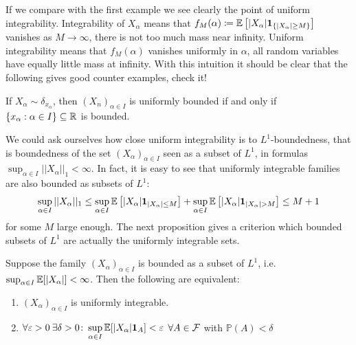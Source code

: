 If we compare with the first example we see clearly the point of uniform integrability. Integrability of $X_\alpha$ means that 
$f_M(\alpha) \coloneqq \mathbb{E}\left[\lvert X_{\alpha} \rvert \mathbf 1_{\{\lvert X_{\alpha} \rvert \geq M\}}\right]$ vanishes as $M\to \infty$, there is not too much mass near infinity. Uniform integrability means that $f_M(\alpha)$ vanishes uniformly in $\alpha$, all random variables have equally little mass at infinity. With this intuition it should be clear that the following gives good counter examples, check it!
\begin{luebung}
	If $X_\alpha \sim \delta_{x_\alpha}$, then $(X_n)_{\alpha \in I}$ is uniformly bounded if and only if $\{x_\alpha:\alpha\in I\}\subseteq \mathbb{R}$ is bounded. 

\end{luebung}
We could ask ourselves how close uniform integrability is to $L^1$-boundedness, that is boundedness of the set $(X_\alpha)_{\alpha \in I}$ seen as a subset of $L^1$, in formulas $\sup_{\alpha\in I}||X_\alpha||_{1}<\infty$.  In fact, it is easy to see that uniformly integrable families are also bounded as subsets of $L^1$:
			\begin{align}\label{uib}
				\sup\limits_{\alpha\in I} ||X_{\alpha}||_1 \leq \sup\limits_{\alpha\in I}\mathbb{E}\left[\lvert X_{\alpha}\rvert \mathbf 1_{\lvert X_{\alpha}\rvert \leq M}\right] + \sup\limits_{\alpha\in I}\mathbb{E}\left[\lvert X_{\alpha}\rvert \mathbf 1_{\lvert X_{\alpha}\rvert > M}\right] \leq M + 1
			\end{align}
			for some $M$ large enough. The next proposition gives a criterion which bounded subsets of $L^1$ are actually the uniformly integrable sets.
\begin{llemma}
\begin{prop}\label{ui_alternative}
	Suppose the family $(X_{\alpha})_{\alpha\in I}$ is bounded as a subset of $L^1$, i.e. $\sup_{\alpha\in I} \mathbb{E}[\lvert X_{\alpha}\rvert] < \infty$. Then the following are equivalent:
	\begin{enumerate}[label=(\roman*)]
		\item
			$(X_{\alpha})_{\alpha\in I}$ is uniformly integrable.
		\item
			$\forall \varepsilon > 0\: \exists \delta > 0 \colon \sup\limits_{\alpha\in I} \mathbb{E}[\lvert X_{\alpha}\lvert \mathbf 1_A] < \varepsilon$ $\forall A \in \mathcal{F}$ with $\mathbb{P}(A)< \delta$
	\end{enumerate}
\end{prop}
\end{llemma}
